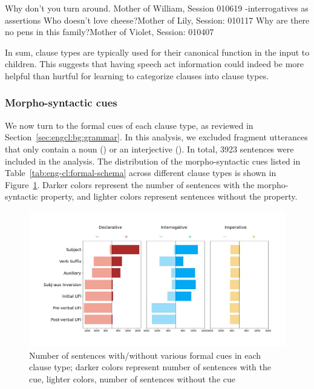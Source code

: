 Why don’t you turn around.	\hfill Mother of William, Session 010619
\eex
{}
\twh-interrogatives as assertions
\bxl{}
Who doesn’t love cheese?\hfill	Mother of Lily, Session: 010117
\ex Why are there no pens in this family?\hfill	Mother of Violet, Session: 010407
\exl
\eex


In sum, clause types are typically used for their canonical function in the input to children. This suggests that having speech act information could indeed be more helpful than hurtful for learning to categorize clauses into clause types.

\subsubsection{Morpho-syntactic cues}
\label{sec:engcl:corpus:formal}
We now turn to the formal cues of each clause type, as reviewed in Section~\ref{sec:engcl:bg:grammar}. In this analysis, we excluded fragment utterances that only contain a noun () or an interjective (). In total, 3923 sentences were included in the analysis. The distribution of the morpho-syntactic cues listed in Table~\ref{tab:eng-cl:formal-schema} across different clause types is shown in Figure~\ref{fig:real-syncluster}. Darker colors represent the number of sentences with the morpho-syntactic property, and lighter colors represent sentences without the property.%





\begin{figure}[H]
    \centering
    \includegraphics[width=1\textwidth]{figures/real-syncluster.jpg}
    \caption{Number of sentences with/without various formal cues in each clause type; darker colors represent number of sentences with the cue, lighter colors, number of sentences without the cue }
    \label{fig:real-syncluster}
\end{figure}

